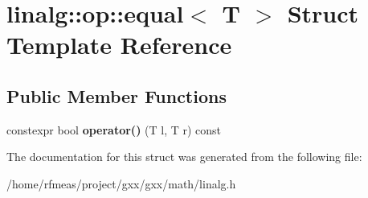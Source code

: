 \hypertarget{structlinalg_1_1op_1_1equal}{}\section{linalg\+:\+:op\+:\+:equal$<$ T $>$ Struct Template Reference}
\label{structlinalg_1_1op_1_1equal}
\subsection*{Public Member Functions}
\begin{DoxyCompactItemize}
\item 
constexpr bool {\bfseries operator()} (T l, T r) const \hypertarget{structlinalg_1_1op_1_1equal_a8e85a0449baa8fb4414230309dcd5af8}{}\label{structlinalg_1_1op_1_1equal_a8e85a0449baa8fb4414230309dcd5af8}

\end{DoxyCompactItemize}


The documentation for this struct was generated from the following file\+:\begin{DoxyCompactItemize}
\item 
/home/rfmeas/project/gxx/gxx/math/linalg.\+h\end{DoxyCompactItemize}
